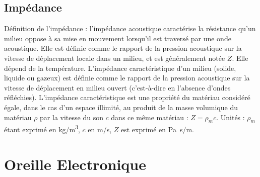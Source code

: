 
\subsection{Impédance}
\label{impedance}
Définition de l'impédance : l'impédance acoustique
caractérise la résistance qu'un milieu oppose à sa mise en mouvement
lorsqu'il est traversé par une onde acoustique. Elle est définie comme
le rapport de la pression acoustique sur la vitesse de déplacement
locale dans un milieu, et est généralement notée $Z$. Elle dépend de
la température. L'impédance caractéristique d'un milieu (solide, liquide
ou gazeux) est définie comme le rapport de la pression acoustique
sur la vitesse de déplacement en milieu ouvert (c'est-à-dire
en l'absence d'ondes réfléchies). L'impédance caractéristique est
une propriété du matériau considéré égale, dans le cas d'un espace
illimité, au produit de la masse volumique du matériau $\rho$
par la vitesse du son $c$ dans ce même matériau : $Z = \rho_{m} c$.
Unités : $\rho_{m}$ étant exprimé en \si{kg/m\cubed},
$c$ en \si{m/s}, $Z$ est
exprimé en \si{\pascal . s/m}. \autocite {futura-sciences}




\section{Oreille Electronique}
\label{oreilleelectronique}


